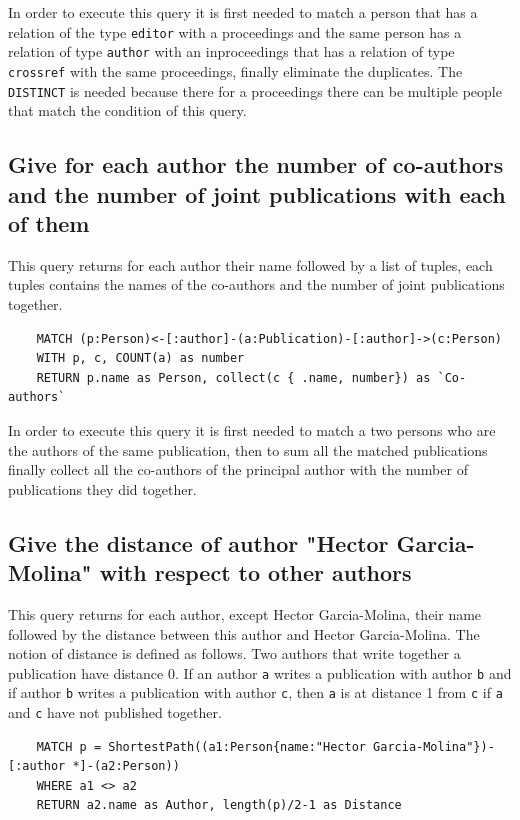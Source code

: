 \documentclass{article}
\begin{document}
In order to execute this query it is first needed to match a person that has a relation of the type \texttt{editor} with a proceedings and the same person has a relation of type \texttt{author} with an inproceedings that has a relation of type \texttt{crossref} with the same proceedings, finally eliminate the duplicates. The \texttt{DISTINCT} is needed because there for a proceedings there can be multiple people that match the condition of this query.


\subsection{Give for each author the number of co-authors and the number of joint publications with each of them}
This query returns for each author their name followed by a list of tuples, each tuples contains the names of the co-authors and the number of joint publications together.

\begin{lstlisting}
    MATCH (p:Person)<-[:author]-(a:Publication)-[:author]->(c:Person)
    WITH p, c, COUNT(a) as number
    RETURN p.name as Person, collect(c { .name, number}) as `Co-authors`
\end{lstlisting}

In order to execute this query it is first needed to match a two persons who are the authors of the same publication, then to sum all the matched publications finally collect all the co-authors of the principal author with the number of publications they did together.

\subsection{Give the distance of author "Hector Garcia-Molina" with respect to other authors}
This query returns for each author, except Hector Garcia-Molina, their name followed by the distance between this author and Hector Garcia-Molina.
The notion of distance is defined as follows. Two authors that write together a publication have distance 0. If an author \texttt{a} writes a publication with author \texttt{b} and if author \texttt{b} writes a publication with author \texttt{c}, then \texttt{a} is at distance 1 from \texttt{c} if \texttt{a} and \texttt{c} have not published together.
\begin{lstlisting}
    MATCH p = ShortestPath((a1:Person{name:"Hector Garcia-Molina"})-[:author *]-(a2:Person))
    WHERE a1 <> a2
    RETURN a2.name as Author, length(p)/2-1 as Distance
\end{lstlisting}
\end{document}

